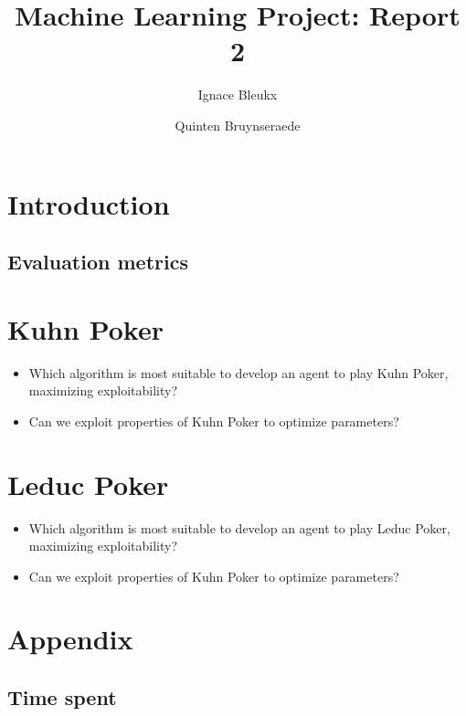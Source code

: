 \documentclass[10pt,a4paper]{article}
\title{Machine Learning Project: Report 2}
\author{Ignace Bleukx \and Quinten Bruynseraede}
\begin{document}
\maketitle
\section{Introduction}
\subsection{Evaluation metrics}
\section{Kuhn Poker}
\begin{tcolorbox}
\begin{itemize}
\item{Which algorithm is most suitable to develop an agent to play Kuhn Poker, maximizing exploitability?}
\item{Can we exploit properties of Kuhn Poker to optimize parameters?}

\end{itemize}
\end{tcolorbox}

\section{Leduc Poker}
\begin{tcolorbox}
\begin{itemize}
\item{Which algorithm is most suitable to develop an agent to play Leduc Poker, maximizing exploitability?}
\item{Can we exploit properties of Kuhn Poker to optimize parameters?}
\end{itemize}
\end{tcolorbox}



\section*{Appendix}
\subsection{Time spent}
\end{document}
